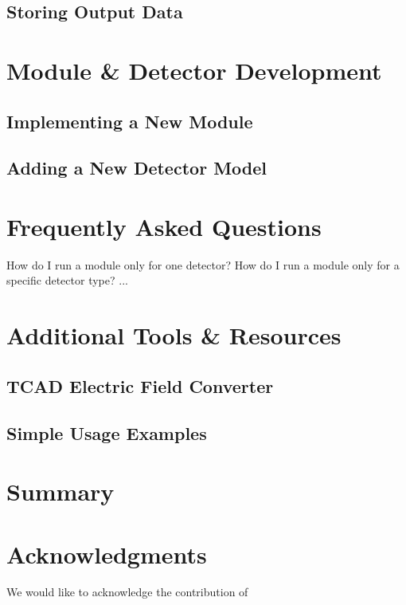 \documentclass{scrartcl}
\begin{document}
\subsection{Storing Output Data}

\section{Module \& Detector Development}
\subsection{Implementing a New Module}
\subsection{Adding a New Detector Model}

\section{Frequently Asked Questions}
How do I run a module only for one detector?
How do I run a module only for a specific detector type?
...

\section{Additional Tools \& Resources}
\subsection{TCAD Electric Field Converter}
\subsection{Simple Usage Examples}

\section{Summary}

\section{Acknowledgments}
We would like to acknowledge the contribution of

\appendix
\clearpage


\clearpage
{}
{}
\begin{thebibliography}{99}
  
\end{thebibliography}
\end{document}
